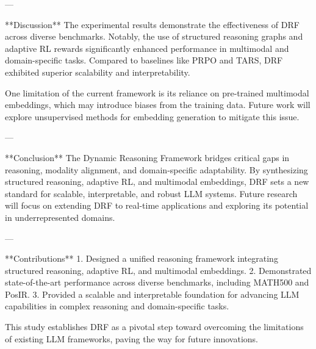 ---

**Discussion**  
The experimental results demonstrate the effectiveness of DRF across diverse benchmarks. Notably, the use of structured reasoning graphs and adaptive RL rewards significantly enhanced performance in multimodal and domain-specific tasks. Compared to baselines like PRPO and TARS, DRF exhibited superior scalability and interpretability.

One limitation of the current framework is its reliance on pre-trained multimodal embeddings, which may introduce biases from the training data. Future work will explore unsupervised methods for embedding generation to mitigate this issue.

---

**Conclusion**  
The Dynamic Reasoning Framework bridges critical gaps in reasoning, modality alignment, and domain-specific adaptability. By synthesizing structured reasoning, adaptive RL, and multimodal embeddings, DRF sets a new standard for scalable, interpretable, and robust LLM systems. Future research will focus on extending DRF to real-time applications and exploring its potential in underrepresented domains.

---

**Contributions**  
1. Designed a unified reasoning framework integrating structured reasoning, adaptive RL, and multimodal embeddings.  
2. Demonstrated state-of-the-art performance across diverse benchmarks, including MATH500 and PosIR.  
3. Provided a scalable and interpretable foundation for advancing LLM capabilities in complex reasoning and domain-specific tasks.  

This study establishes DRF as a pivotal step toward overcoming the limitations of existing LLM frameworks, paving the way for future innovations.